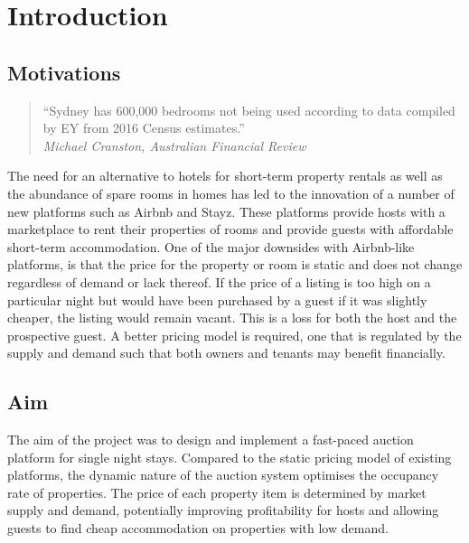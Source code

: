 \section{Introduction}

\subsection{Motivations}

\smallskip
\begin{quote}
  ``Sydney has 600,000 bedrooms not being used according to data
compiled by EY from 2016 Census estimates.'' \\
  \hspace*{\fill}\emph{Michael Cranston, Australian Financial Review}
\end{quote}

The need for an alternative to hotels for short-term property rentals as well
as the abundance of spare rooms in homes has led to the innovation of
a number of new platforms such as Airbnb and Stayz.
These platforms provide hosts with a marketplace to rent their properties of rooms and
provide guests with affordable short-term accommodation. One of the major downsides
with Airbnb-like platforms, is that
the price for the property or room is static and does not change regardless
of demand or lack thereof. If the price of a listing is too high on a particular night
but would have been purchased by a guest if it was slightly cheaper, the listing would
remain vacant. This is a loss for both the host and the prospective guest. A better
pricing model is required, one that is regulated by the supply and demand such that
both owners and tenants may benefit financially.

\subsection{Aim}

The aim of the project was to design and implement a fast-paced auction
platform for single night stays. Compared to the static pricing
model of existing platforms, the dynamic nature of the auction system
optimises the occupancy rate of properties. The price of each property item is
determined by market supply and demand, potentially improving profitability for
hosts and allowing guests to find cheap accommodation on properties with low demand.

